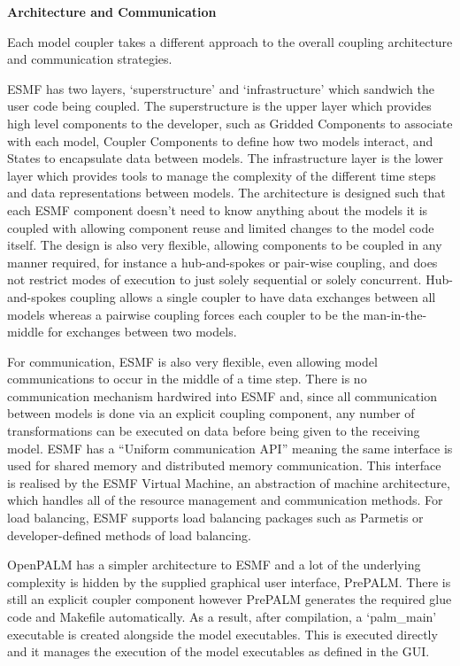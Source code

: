 \textbf{Architecture and Communication}

Each model coupler takes a different approach to the overall coupling
architecture and communication strategies.

ESMF has two layers, `superstructure' and `infrastructure' which sandwich the
user code being coupled. The superstructure is the upper layer which provides
high level components to the developer, such as Gridded Components to associate
with each model, Coupler Components to define how two models interact, and
States to encapsulate data between models. The infrastructure layer is the lower
layer which provides tools to manage the complexity of the different time steps
and data representations between models. The architecture is designed such that
each ESMF component doesn't need to know anything about the models it is coupled
with allowing component reuse and limited changes to the model code itself. The
design is also very flexible, allowing components to be coupled in any manner
required, for instance a hub-and-spokes or pair-wise coupling, and does not
restrict modes of execution to just solely sequential or solely concurrent.
Hub-and-spokes coupling allows a single coupler to have data exchanges between
all models whereas a pairwise coupling forces each coupler to be the
man-in-the-middle for exchanges between two models.

For communication, ESMF is also very flexible, even allowing model
communications to occur in the middle of a time step. There is no communication
mechanism hardwired into ESMF and, since all communication between models is
done via an explicit coupling component, any number of transformations can be
executed on data before being given to the receiving model. ESMF has a ``Uniform
communication API'' \cite{ESMF2014} meaning the same interface is used for
shared memory and distributed memory communication. This interface is realised
by the ESMF Virtual Machine, an abstraction of machine architecture, which
handles all of the resource management and communication methods. For load
balancing, ESMF supports load balancing packages such as Parmetis
\cite{Hoefler2010,Karypis1998} or developer-defined methods of load balancing.

OpenPALM has a simpler architecture to ESMF and a lot of the underlying
complexity is hidden by the supplied graphical user interface, PrePALM. There is
still an explicit coupler component however PrePALM generates the required glue
code and Makefile automatically. As a result, after compilation, a `palm\_main'
executable is created alongside the model executables. This is executed directly
and it manages the execution of the model executables as defined in the GUI.

